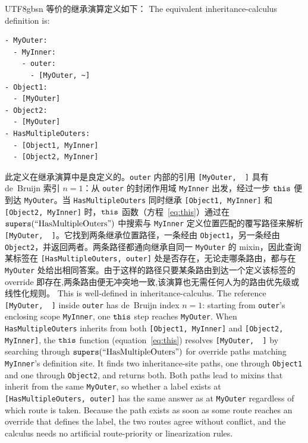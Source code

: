 \begin{CJK*}{UTF8}{gbsn}
\ifPaperChinese
等价的继承演算定义如下：
\else
The equivalent inheritance-calculus definition is:
\fi
\begin{listing}[htbp]
  \caption{}
  \label{lst:ic-multi-outer}
\begin{verbatim}
- MyOuter:
  - MyInner:
    - outer:
      - [MyOuter, ~]
- Object1:
  - [MyOuter]
- Object2:
  - [MyOuter]
- HasMultipleOuters:
  - [Object1, MyInner]
  - [Object2, MyInner]
\end{verbatim}
\end{listing}
\ifPaperChinese
此定义在继承演算中是良定义的。\texttt{outer} 内部的引用 \texttt{[MyOuter, ~]} 具有 de~Bruijn 索引 $n = 1$：从 \texttt{outer} 的封闭作用域 \texttt{MyInner} 出发，经过一步 $\mathtt{this}$ 便到达 \texttt{MyOuter}。当 \texttt{HasMultipleOuters} 同时继承 \texttt{[Object1, MyInner]} 和 \texttt{[Object2, MyInner]} 时，$\mathtt{this}$ 函数（方程~\ref{eq:this}）通过在 $\mathtt{supers}(\text{``HasMultipleOuters''})$ 中搜索与 \texttt{MyInner} 定义位置匹配的覆写路径来解析 \texttt{[MyOuter, ~]}。它找到两条继承位置路径，一条经由 \texttt{Object1}，另一条经由 \texttt{Object2}，并返回两者。两条路径都通向继承自同一 \texttt{MyOuter} 的 mixin，因此查询某标签在 \texttt{[HasMultipleOuters, outer]} 处是否存在，无论走哪条路由，都与在 \texttt{MyOuter} 处给出相同答案。由于这样的路径只要某条路由到达一个定义该标签的 override 即存在,两条路由便无冲突地一致,该演算也无需任何人为的路由优先级或线性化规则。
\else
This is well-defined in inheritance-calculus.
The reference
\texttt{[MyOuter, ~]} inside \texttt{outer}
has de~Bruijn index $n = 1$:
starting from \texttt{outer}'s enclosing scope
\texttt{MyInner}, one $\mathtt{this}$ step reaches
\texttt{MyOuter}.
When \texttt{HasMultipleOuters} inherits from both
\texttt{[Object1, MyInner]} and
\texttt{[Object2, MyInner]},
the $\mathtt{this}$ function (equation~\ref{eq:this}) resolves
\texttt{[MyOuter, ~]} by searching through
$\mathtt{supers}(\text{``HasMultipleOuters''})$ for override paths matching
\texttt{MyInner}'s definition site.
It finds two inheritance-site paths, one through
\texttt{Object1} and one through \texttt{Object2}, and
returns both.
Both paths lead to mixins that inherit from the same
\texttt{MyOuter}, so whether a label exists at
\texttt{[HasMultipleOuters, outer]} has the same answer as at
\texttt{MyOuter} regardless of which
route is taken.
Because the path exists as soon as some route reaches an override that defines the label, the two routes agree without conflict, and the calculus needs no artificial route-priority or linearization rules.
\fi


\end{CJK*}
